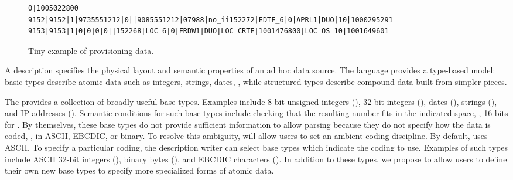 \documentclass[11pt]{article}
\begin{document}
\begin{figure*}
\begin{small}
\begin{verbatim}
0|1005022800
9152|9152|1|9735551212|0||9085551212|07988|no_ii152272|EDTF_6|0|APRL1|DUO|10|1000295291
9153|9153|1|0|0|0|0||152268|LOC_6|0|FRDW1|DUO|LOC_CRTE|1001476800|LOC_OS_10|1001649601
\end{verbatim}
\caption{Tiny example of \dibbler{} provisioning data.}
\label{figure:dibbler-records}
\end{small}
\end{figure*}

A \datatype{} description specifies the physical layout and 
semantic properties of an ad hoc data source. 
The language provides a type-based model:
basic types describe atomic data such as integers, strings, dates, \etc{}, while
structured types describe compound data built from simpler pieces.
\suppressfloats

The \datatype{} provides a collection of broadly useful base
types.  Examples include 8-bit unsigned integers (), 32-bit
integers (), dates (), strings (),
and IP addresses ().  Semantic conditions for such base types
include checking that the resulting number fits in the indicated
space, \ie, 16-bits for .  By themselves, these base types
do not provide sufficient information to allow parsing because they do
not specify how the data is coded, \ie{}, in ASCII, EBCDIC, or binary.
To resolve this ambiguity, \datatype{} will allow users to set an
ambient coding discipline.  By default, \pads{} uses ASCII.  To
specify a particular coding, the description writer can select base
types which indicate the coding to use.  Examples of such types
include ASCII 32-bit integers (), binary bytes
(), and EBCDIC characters ().  In addition to
these types, we propose to allow users to define their own new base types to specify more
specialized forms of atomic data.
\end{document}
